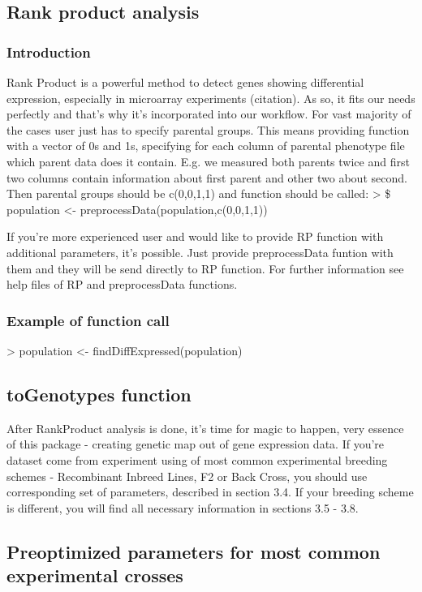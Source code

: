 \documentclass{article}
\begin{document}
\subsection{Rank product analysis}
\subsubsection{Introduction}
Rank Product \citep{Hong:2006} is a powerful method to detect genes showing differential expression, especially in microarray experiments (citation). As so, it fits our needs perfectly and that's why it's incorporated into our workflow. For vast majority of the cases user just has to specify parental groups. This means providing function with a vector of 0s and 1s, specifying for each column of parental phenotype file which parent data does it contain. E.g. we measured both parents twice and first two columns contain information about first parent and other two about second. Then parental groups should be c(0,0,1,1) and function should be called: >  \$ population <- preprocessData(population,c(0,0,1,1))

{\noindent}If you're more experienced user and would like to provide RP function with additional parameters, it's possible. Just provide preprocessData funtion with them and they will be send directly to RP function. For further information see help files of RP and preprocessData functions.
\subsubsection{Example of function call}
\begin{Schunk}
\begin{Sinput}
> population <- findDiffExpressed(population)
\end{Sinput}
\end{Schunk}

\subsection{toGenotypes function}
After RankProduct analysis is done, it's time for magic to happen,  very essence of this package - creating genetic map out of gene expression data. If you're dataset come from experiment using of most common experimental breeding schemes - Recombinant Inbreed Lines, F2 or Back Cross, you should use corresponding set of parameters, described in section 3.4. If your breeding scheme is different, you will find all necessary information in sections 3.5 - 3.8.
\subsection{Preoptimized parameters for most common experimental crosses}
\end{document}
